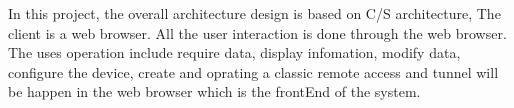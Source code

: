 

In this project, the overall architecture design is based on C/S architecture, 
The client is a web browser. All the user interaction is done through the web browser.
The uses operation include require data, display infomation, modify data, 
configure the device, create and oprating a classic remote access and tunnel will be happen
in the web browser which is the frontEnd of the system.








